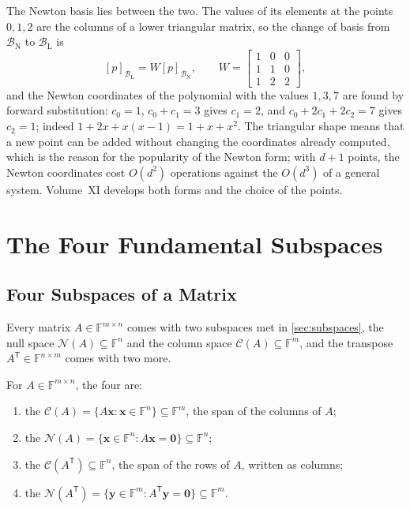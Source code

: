 The Newton basis lies between the two. The values of its elements at the points $0,1,2$ are the columns of a lower triangular matrix, so the change of basis from $\mathcal B_{\mathrm N}$ to $\mathcal B_{\mathrm L}$ is
\[
[p]_{\mathcal B_{\mathrm L}}=W[p]_{\mathcal B_{\mathrm N}},\qquad W=\begin{bmatrix}1&0&0\\1&1&0\\1&2&2\end{bmatrix},
\]
and the Newton coordinates of the polynomial with the values $1,3,7$ are found by forward substitution: $c_0=1$, $c_0+c_1=3$ gives $c_1=2$, and $c_0+2c_1+2c_2=7$ gives $c_2=1$; indeed $1+2x+x(x-1)=1+x+x^2$. The triangular shape means that a new point can be added without changing the coordinates already computed, which is the reason for the popularity of the Newton form; with $d+1$ points, the Newton coordinates cost $O(d^2)$ operations against the $O(d^3)$ of a general system. Volume~XI develops both forms and the choice of the points.

\section{The Four Fundamental Subspaces}
\label{sec:four-subspaces}

\subsection{Four Subspaces of a Matrix}

Every matrix $A\in\mathbb F^{m\times n}$ comes with two subspaces met in \cref{sec:subspaces}, the null space $\mathcal N(A)\subseteq\mathbb F^n$ and the column space $\mathcal C(A)\subseteq\mathbb F^m$, and the transpose $A^{\mathsf T}\in\mathbb F^{n\times m}$ comes with two more.

\begin{definition}
\label{def:four-subspaces}
For $A\in\mathbb F^{m\times n}$, the four  are:
\begin{enumerate}
\item the  $\mathcal C(A)=\{A\mathbf x: \mathbf x\in\mathbb F^n\}\subseteq\mathbb F^m$, the span of the columns of $A$;
\item the  $\mathcal N(A)=\{\mathbf x\in\mathbb F^n: A\mathbf x=\mathbf 0\}\subseteq\mathbb F^n$;
\item the  $\mathcal C(A^{\mathsf T})\subseteq\mathbb F^n$, the span of the rows of $A$, written as columns;
\item the  $\mathcal N(A^{\mathsf T})=\{\mathbf y\in\mathbb F^m: A^{\mathsf T}\mathbf y=\mathbf 0\}\subseteq\mathbb F^m$.
\end{enumerate}
\end{definition}

